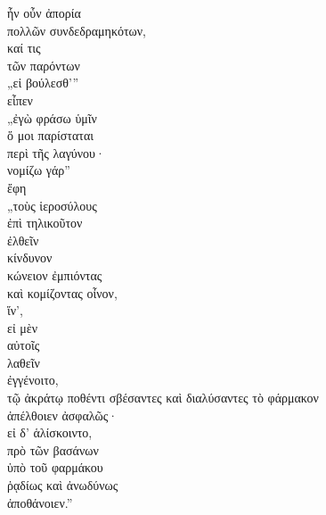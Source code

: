 {\large
\begin{greek}
\noindent ἦν οὖν ἀπορία \\
\tabto{2em} πολλῶν συνδεδραμηκότων, \\
καί τις \\
\tabto{2em} τῶν παρόντων \\
„εἰ βούλεσθ'” \\
εἶπεν\\
„ἐγὼ φράσω ὑμῖν \\
\tabto{2em} ὅ μοι παρίσταται \\
\tabto{4em} περὶ τῆς λαγύνου· \\
νομίζω γάρ”\\
\tabto{2em} ἔφη \\
„τοὺς ἱεροσύλους \\
\tabto{2em} ἐπὶ τηλικοῦτον \\
ἐλθεῖν \\
\tabto{2em} κίνδυνον \\
κώνειον ἐμπιόντας \\
καὶ κομίζοντας οἶνον, \\
ἵν', \\
\tabto{2em} εἰ μὲν \\
\tabto{4em} αὐτοῖς \\
\tabto{4em} λαθεῖν \\
\tabto{2em} ἐγγένοιτο, \\
τῷ ἀκράτῳ ποθέντι σβέσαντες καὶ διαλύσαντες τὸ φάρμακον \\
\tabto{2em} ἀπέλθοιεν ἀσφαλῶς· \\

\tabto{2em} εἰ δ' ἁλίσκοιντο, \\
\tabto{4em} πρὸ τῶν βασάνων \\
\tabto{4em} ὑπὸ τοῦ φαρμάκου \\
\tabto{4em} ῥᾳδίως καὶ ἀνωδύνως \\
\tabto{2em} ἀποθάνοιεν.”\\

\end{greek}
}

